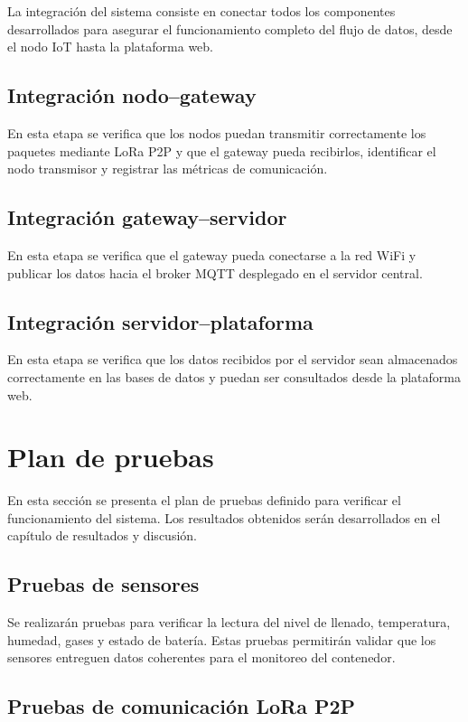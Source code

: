 La integración del sistema consiste en conectar todos los componentes desarrollados para asegurar el funcionamiento completo del flujo de datos, desde el nodo IoT hasta la plataforma web.

\subsection{Integración nodo--gateway}

En esta etapa se verifica que los nodos puedan transmitir correctamente los paquetes mediante LoRa P2P y que el gateway pueda recibirlos, identificar el nodo transmisor y registrar las métricas de comunicación.

\subsection{Integración gateway--servidor}

En esta etapa se verifica que el gateway pueda conectarse a la red WiFi y publicar los datos hacia el broker MQTT desplegado en el servidor central.

\subsection{Integración servidor--plataforma}

En esta etapa se verifica que los datos recibidos por el servidor sean almacenados correctamente en las bases de datos y puedan ser consultados desde la plataforma web.

\section{Plan de pruebas}

En esta sección se presenta el plan de pruebas definido para verificar el funcionamiento del sistema. Los resultados obtenidos serán desarrollados en el capítulo de resultados y discusión.

\subsection{Pruebas de sensores}

Se realizarán pruebas para verificar la lectura del nivel de llenado, temperatura, humedad, gases y estado de batería. Estas pruebas permitirán validar que los sensores entreguen datos coherentes para el monitoreo del contenedor.

\subsection{Pruebas de comunicación LoRa P2P}

